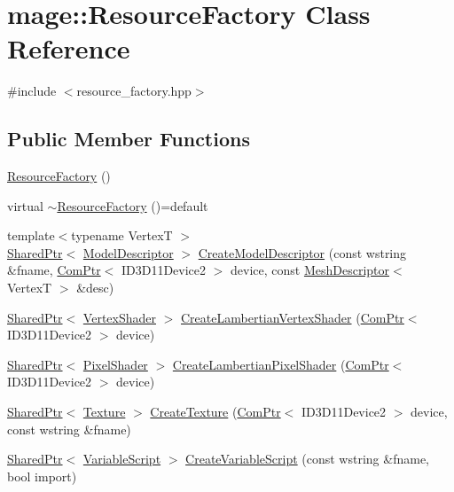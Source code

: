 \hypertarget{classmage_1_1_resource_factory}{}\section{mage\+:\+:Resource\+Factory Class Reference}
\label{classmage_1_1_resource_factory}


{\ttfamily \#include $<$resource\+\_\+factory.\+hpp$>$}

\subsection*{Public Member Functions}
\begin{DoxyCompactItemize}
\item 
\hyperlink{classmage_1_1_resource_factory_a340bde81096427e319b60063ae771a0d}{Resource\+Factory} ()
\item 
virtual \hyperlink{classmage_1_1_resource_factory_a07b50ac86226772e3c7d119ff9e10043}{$\sim$\+Resource\+Factory} ()=default
\item 
{\footnotesize template$<$typename VertexT $>$ }\\\hyperlink{namespacemage_a1e01ae66713838a7a67d30e44c67703e}{Shared\+Ptr}$<$ \hyperlink{classmage_1_1_model_descriptor}{Model\+Descriptor} $>$ \hyperlink{classmage_1_1_resource_factory_af39d72641cc34c6d9c37699f6a904df3}{Create\+Model\+Descriptor} (const wstring \&fname, \hyperlink{namespacemage_ae74f374780900893caa5555d1031fd79}{Com\+Ptr}$<$ I\+D3\+D11\+Device2 $>$ device, const \hyperlink{structmage_1_1_mesh_descriptor}{Mesh\+Descriptor}$<$ VertexT $>$ \&desc)
\item 
\hyperlink{namespacemage_a1e01ae66713838a7a67d30e44c67703e}{Shared\+Ptr}$<$ \hyperlink{classmage_1_1_vertex_shader}{Vertex\+Shader} $>$ \hyperlink{classmage_1_1_resource_factory_a06490ac366baeff47fcd708fa83e24ae}{Create\+Lambertian\+Vertex\+Shader} (\hyperlink{namespacemage_ae74f374780900893caa5555d1031fd79}{Com\+Ptr}$<$ I\+D3\+D11\+Device2 $>$ device)
\item 
\hyperlink{namespacemage_a1e01ae66713838a7a67d30e44c67703e}{Shared\+Ptr}$<$ \hyperlink{classmage_1_1_pixel_shader}{Pixel\+Shader} $>$ \hyperlink{classmage_1_1_resource_factory_a85ca9708851c325317a17d698f54bc02}{Create\+Lambertian\+Pixel\+Shader} (\hyperlink{namespacemage_ae74f374780900893caa5555d1031fd79}{Com\+Ptr}$<$ I\+D3\+D11\+Device2 $>$ device)
\item 
\hyperlink{namespacemage_a1e01ae66713838a7a67d30e44c67703e}{Shared\+Ptr}$<$ \hyperlink{classmage_1_1_texture}{Texture} $>$ \hyperlink{classmage_1_1_resource_factory_a68770835276ed7baa2bc99bda9d8b41a}{Create\+Texture} (\hyperlink{namespacemage_ae74f374780900893caa5555d1031fd79}{Com\+Ptr}$<$ I\+D3\+D11\+Device2 $>$ device, const wstring \&fname)
\item 
\hyperlink{namespacemage_a1e01ae66713838a7a67d30e44c67703e}{Shared\+Ptr}$<$ \hyperlink{classmage_1_1_variable_script}{Variable\+Script} $>$ \hyperlink{classmage_1_1_resource_factory_a523e3f76a3d8347f6d75a7b87a291b1e}{Create\+Variable\+Script} (const wstring \&fname, bool import)
\end{DoxyCompactItemize}
